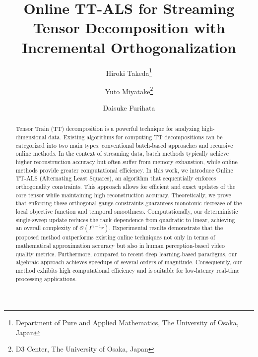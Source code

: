 \documentclass[a4paper, 11pt]{article}
\title{Online TT-ALS for Streaming Tensor Decomposition with Incremental Orthogonalization}
\author{
    Hiroki Takeda\thanks{Department of Pure and Applied Mathematics, The University of Osaka, Japan} \and
    Yuto Miyatake\thanks{D3 Center, The University of Osaka, Japan} \and
    Daisuke Furihata\footnotemark[2]
}
\date{}
\theoremstyle{plain}
\theoremstyle{definition}
\theoremstyle{remark}
\begin{document}
\maketitle


\begin{abstract}
Tensor Train (TT) decomposition is a powerful technique for analyzing high-dimensional data.
Existing algorithms for computing TT decompositions can be categorized into two main types: conventional batch-based approaches and recursive online methods.
In the context of streaming data, batch methods typically achieve higher reconstruction accuracy but often suffer from memory exhaustion, while online methods provide greater computational efficiency.
In this work, we introduce Online TT-ALS (Alternating Least Squares), an algorithm that sequentially enforces orthogonality constraints.
This approach allows for efficient and exact updates of the core tensor while maintaining high reconstruction accuracy.
Theoretically, we prove that enforcing these orthogonal gauge constraints guarantees monotonic decrease of the local objective function and temporal smoothness.
Computationally, our deterministic single-sweep update reduces the rank dependence from quadratic to linear, achieving an overall complexity of $\mathcal{O}(I^{n-1} r)$.
Experimental results demonstrate that the proposed method outperforms existing online techniques not only in terms of mathematical approximation accuracy but also in human perception-based video quality metrics.
Furthermore, compared to recent deep learning-based paradigms, our algebraic approach achieves speedups of several orders of magnitude.
Consequently, our method exhibits high computational efficiency and is suitable for low-latency real-time processing applications.
\end{abstract}
\end{document}
